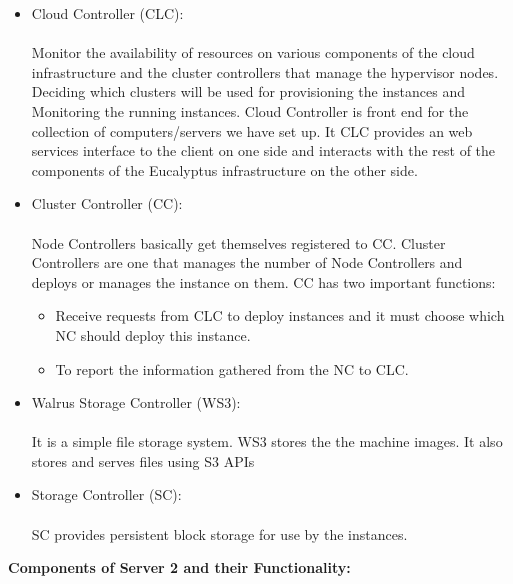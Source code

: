 \documentclass[a4page,12pt]{article}
\begin{document}
\begin{itemize}
\item Cloud Controller (CLC):\\\\
Monitor the availability of resources on various components of the cloud infrastructure and the cluster controllers that manage the hypervisor nodes. Deciding which clusters will be used for provisioning the instances and Monitoring the running instances.
Cloud Controller is front end for the collection of computers/servers we have set up. It CLC provides an web services interface to the client on one side and interacts with the rest of the components of the Eucalyptus infrastructure on the other side.\\
\item Cluster Controller (CC):\\\\
Node Controllers basically get themselves registered to CC. Cluster Controllers are one that
manages the number of Node Controllers and deploys or manages the instance on them.
CC has two important functions:
\begin{itemize}
\item Receive requests from CLC to deploy instances and it must choose which NC should deploy this instance.
\item To report the information gathered from the NC to CLC.\\
\end{itemize}
\item Walrus Storage Controller (WS3):\\\\
It is a simple file storage system. WS3 stores the the machine images. It also stores and serves files using S3 APIs%
\item Storage Controller (SC):\\\\
SC provides persistent block storage for use by the instances.
\end{itemize}
\textbf{Components of Server 2 and their Functionality:}\\
\end{document}
